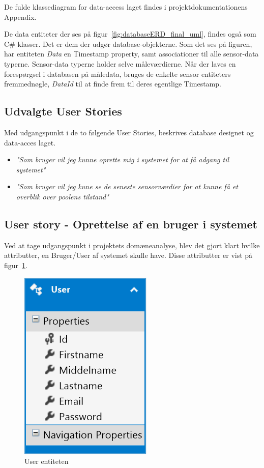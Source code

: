 De fulde klassediagram for data-access laget findes i projektdokumentationens Appendix.

De data entiteter der ses på figur~\ref{fig:databaseERD_final_uml}, findes også som C\# klasser. Det er dem der udgør database-objekterne. Som det ses på figuren, har entiteten \textit{Data} en Timestamp property, samt associationer til alle sensor-data typerne. Sensor-data typerne holder selve måleværdierne. Når der laves en forespørgsel i databasen på måledata, bruges de enkelte sensor entiteters fremmednøgle, \textit{DataId} til at finde frem til deres egentlige Timestamp.

\subsection{Udvalgte User Stories}
Med udgangspunkt i de to følgende User Stories, beskrives database designet og data-acces laget. 

\begin{itemize}
	\item \textit{"Som bruger vil jeg kunne oprette mig i systemet for at få adgang til systemet"}
	\item \textit{"Som bruger vil jeg kune se de seneste sensorværdier for at kunne få et overblik over poolens tilstand"}
\end{itemize}

\subsection{User story - Oprettelse af en bruger i systemet}

Ved at tage udgangspunkt i projektets domæneanalyse, blev det gjort klart hvilke attributter, en Bruger/User af systemet skulle have. Disse attributter er vist på figur~\ref{fig:database_model_1}.

\begin{figure}[h]
\centering
\includegraphics[width=0.2\linewidth]{figs/database/database_model_1.png}
\caption{User entiteten}
\label{fig:database_model_1}
\end{figure}


